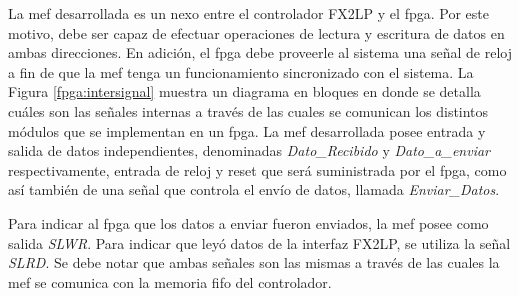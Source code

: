 	La \acrshort{mef} desarrollada es un nexo entre el controlador FX2LP y el \acrshort{fpga}. Por este motivo, debe ser capaz de efectuar operaciones de lectura y escritura de datos en ambas direcciones.
	En adición, el \acrshort{fpga} debe proveerle al sistema una señal de reloj a fin de que la \acrshort{mef} tenga un funcionamiento sincronizado con el sistema.	La Figura \ref{fpga:intersignal} muestra un diagrama en bloques en donde se detalla cuáles son las señales internas a través de las cuales se comunican los distintos módulos que se implementan en un \acrshort{fpga}. La \acrshort{mef} desarrollada posee entrada y salida de datos independientes, denominadas \textit{Dato\_Recibido} y \textit{Dato\_a\_enviar} respectivamente, entrada de reloj y reset que será suministrada por el \acrshort{fpga}, como así también de una señal que controla el envío de datos, llamada \textit{Enviar\_Datos}.
	
	Para indicar al \acrshort{fpga} que los datos a enviar fueron enviados, la \acrshort{mef} posee como salida \textit{SLWR}. Para indicar que leyó datos de la interfaz FX2LP, se utiliza la señal \textit{SLRD}. Se debe notar que ambas señales son las mismas a través de las cuales la \acrshort{mef} se comunica con la memoria \acrshort{fifo} del controlador.
	


	
